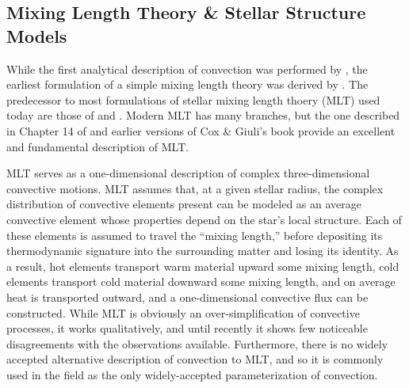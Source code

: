 \subsection{Mixing Length Theory \& Stellar Structure Models}
While the first analytical description of convection was performed by \citet{rayleigh1916}, the earliest formulation of a simple mixing length theory was derived by \citet{prandtl1925}.
The predecessor to most formulations of stellar mixing length thoery (MLT) used today are those of \citet{vitense1953} and \citet{bohm-vitense1958}.
Modern MLT has many branches, but the one described in Chapter 14 of \citet{weiss&all2004} and earlier versions of Cox \& Giuli's book provide an excellent and fundamental description of MLT.

MLT serves as a one-dimensional description of complex three-dimensional convective motions.
MLT assumes that, at a given stellar radius, the complex distribution of convective elements present can be modeled as an average convective element whose properties depend on the star's local structure.
Each of these elements is assumed to travel the ``mixing length,'' before depositing its thermodynamic signature into the surrounding matter and losing its identity.
As a result, hot elements transport warm material upward some mixing length, cold elements transport cold material downward some mixing length, and on average heat is transported outward, and a one-dimensional convective flux can be constructed.
While MLT is obviously an over-simplification of convective processes, it works qualitatively, and until recently it shows few noticeable disagreements with the observations available.
Furthermore, there is no widely accepted alternative description of convection to MLT, and so it is commonly used in the field as the only widely-accepted parameterization of convection.

